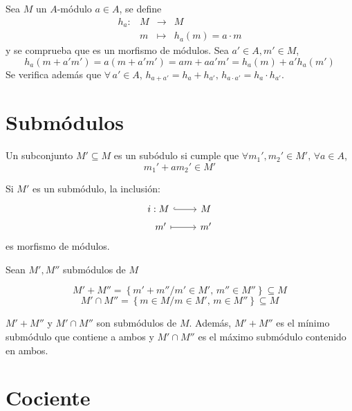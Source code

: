 \begin{ejem}
    Sea $M$ un $A$-m\'odulo $a\in A$, se define 
    $$\begin{array}{rrcl}
        h_a: & M & \longrightarrow & M \\
         & m & \longmapsto & h_a(m) = a\cdot m
    \end{array}$$
    y se comprueba que es un morfismo de m\'odulos. Sea $a'\in A, m'\in M$, 
    $$h_a(m+a'm') = a (m+a'm') = am + aa'm' = h_a (m)+a' h_a (m')$$
    Se verifica adem\'as que $\forall \, a'\in A$, $h_{a+a'} = h_a + h_{a'}, \, h_{a \cdot a'} = h_a \cdot h_{a'}$.
    \end{ejem}

\section{Subm\'odulos}
\begin{defi}
    Un subconjunto $M' \subseteq M$ es un sub\'odulo si cumple que $\forall m_1', m_2' \in M', \, \forall a\in A$, 
    $$m_1'+am_2' \in M'$$
\end{defi}
\begin{prop}
    Si $M'$ es un subm\'odulo, la inclusi\'on:
    $$\bt 
    i: M \arrow[hook]{r} & M \\ [-5mm]
    \, \, \, m' \arrow[mapsto]{r} & m'
    \et$$
    es morfismo de m\'odulos. 
\end{prop}
Sean $M', M''$ subm\'odulos de $M$
\begin{defi}
    $$M'+M'' = \left\{ m'+m'' / m'\in M', \, m'' \in M'' \right\}\subseteq M$$
    $$M' \cap M'' = \left\{m \in M / m\in M', \, m\in M'' \right\}\subseteq M $$
\end{defi}
\begin{prop}
    $M'+M''$ y $M' \cap M''$ son subm\'odulos de $M$. Adem\'as, $M'+M''$ es el m\'inimo subm\'odulo que contiene a ambos y $M' \cap M''$ es el m\'aximo subm\'odulo contenido en ambos.
\end{prop}
\section{Cociente}

